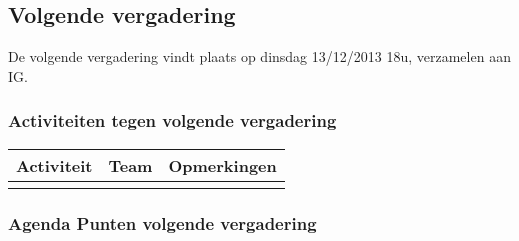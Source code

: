 \subsection{Volgende vergadering}
De volgende vergadering vindt plaats op dinsdag 13/12/2013 18u, verzamelen aan IG.
\subsubsection{Activiteiten tegen volgende vergadering} \label{sec:TODOActiviteiten}
\begin{table} [H]
	\centering
	\begin{tabular} {l|l|l}
		\textbf{Activiteit} & \textbf{Team} & \textbf{Opmerkingen} \\
		\hline
		 &  & \\

	\end{tabular}
\end{table}

\subsubsection{Agenda Punten volgende vergadering}

